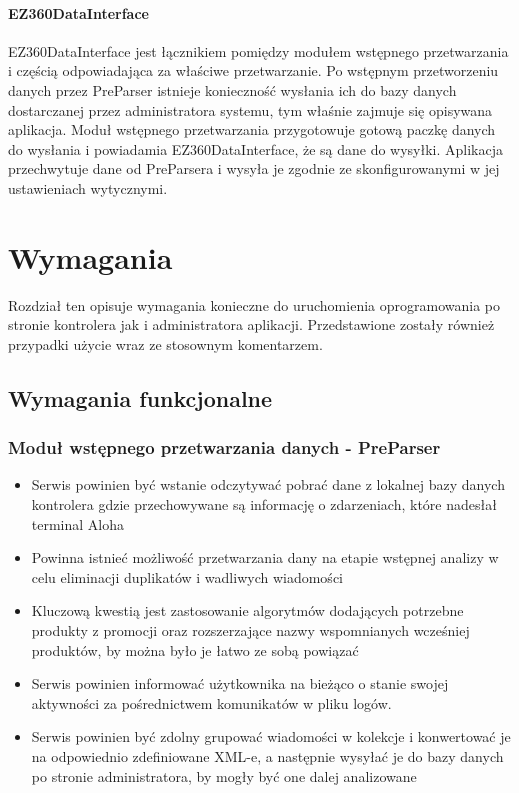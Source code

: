 \documentclass[a4paper]{book}
\begin{document}
\subsubsection{EZ360DataInterface}
EZ360DataInterface jest łącznikiem pomiędzy modułem wstępnego przetwarzania i częścią odpowiadająca za właściwe przetwarzanie. Po wstępnym przetworzeniu danych przez PreParser istnieje konieczność wysłania ich do bazy danych dostarczanej przez administratora systemu, tym właśnie zajmuje się opisywana aplikacja. Moduł wstępnego przetwarzania przygotowuje gotową paczkę danych do wysłania i powiadamia EZ360DataInterface, że są dane do wysyłki. Aplikacja przechwytuje dane od PreParsera i wysyła je zgodnie ze skonfigurowanymi w jej ustawieniach wytycznymi.
\chapter{Wymagania}
Rozdział ten opisuje wymagania konieczne do uruchomienia oprogramowania po stronie kontrolera jak i administratora aplikacji. Przedstawione zostały również przypadki użycie wraz ze stosownym komentarzem.
\section{Wymagania funkcjonalne}
\subsection{Moduł wstępnego przetwarzania danych - PreParser}
\begin{itemize}
	\item Serwis powinien być wstanie odczytywać pobrać dane z lokalnej bazy danych kontrolera gdzie przechowywane są informację o zdarzeniach, które nadesłał terminal Aloha
	\item Powinna istnieć możliwość przetwarzania dany na etapie wstępnej analizy w celu eliminacji duplikatów i wadliwych wiadomości
	\item Kluczową kwestią jest zastosowanie algorytmów dodających potrzebne produkty z promocji oraz rozszerzające nazwy wspomnianych wcześniej produktów, by można było je łatwo ze sobą powiązać
	\item Serwis powinien informować użytkownika na bieżąco o stanie swojej aktywności za pośrednictwem komunikatów w pliku logów.
	\item Serwis powinien być zdolny grupować wiadomości w kolekcje i konwertować je na odpowiednio zdefiniowane XML-e, a następnie wysyłać je do bazy danych po stronie administratora, by mogły być one dalej analizowane
\end{itemize}
\end{document}

